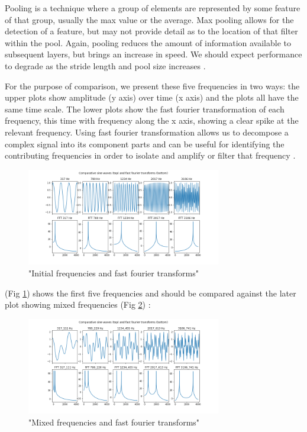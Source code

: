 \documentclass{article}
\begin{document}
Pooling is a technique where a group of elements are represented by some feature of that group, usually the max value or the average.  Max pooling allows for the detection of a feature, but may not provide detail as to the location of that filter within the pool.  Again, pooling reduces the amount of information available to subsequent layers, but brings an increase in speed.  We should expect performance to degrade as the stride length and pool size increases \cite{noauthor_convolutional_nodate}.

For the purpose of comparison, we present these five frequencies in two ways: the upper plots show amplitude (y axis) over time (x axis) and the plots all have the same time scale.  The lower plots show the fast fourier transformation of each frequency, this time with frequency along the x axis, showing a clear spike at the relevant frequency.  Using fast fourier transformation allows us to decompose a complex signal into its component parts and can be useful for identifying the contributing frequencies in order to isolate and amplify or filter that frequency \cite{noauthor_05-frequency-analysis_nodate}.

\begin{figure}[htb]
\begin{minipage}[b]{1\linewidth}
  \centering
  \centerline{\includegraphics[width=8.5cm]{sine_fft_main}}
\caption{"Initial frequencies and fast fourier transforms"}
\label{fig:sin_fft}
\end{minipage}
\end{figure}
%

(Fig \ref{fig:sin_fft}) shows the first five frequencies and should be compared against the later plot showing mixed frequencies (Fig \ref{fig:mixed})
:

\begin{figure}[htb]
\begin{minipage}[b]{1\linewidth}
  \centering
  \centerline{\includegraphics[width=8.5cm]{sine_fft_mixed}}
\caption{"Mixed frequencies and fast fourier transforms"}
\label{fig:mixed}
\end{minipage}
\end{figure}
\end{document}
